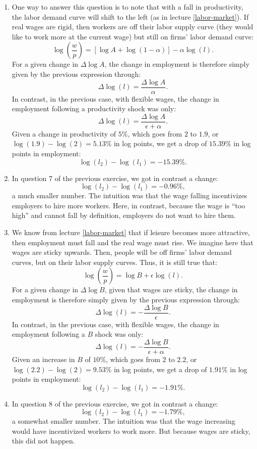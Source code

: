 \documentclass[]{book}
\theoremstyle{definition}
\theoremstyle{definition}
\theoremstyle{definition}
\theoremstyle{remark}
\begin{document}
\begin{enumerate}
\def\labelenumi{\arabic{enumi}.}
\item
  One way to answer this question is to note that with a fall in
  productivity, the labor demand curve will shift to the left (as in
  lecture \ref{labor-market}). If real wages are rigid, then workers are
  off their labor supply curve (they would like to work more at the
  current wage) but still on firms' labor demand curve:
  \[\log\left(\frac{w}{p}\right) = \left[\log A + \log(1-\alpha)\right] -\alpha \log(l).\]
  For a given change in \(\Delta \log A\), the change in employment is
  therefore simply given by the previous expression through:
  \[\Delta \log(l)=\frac{\Delta \log A}{\alpha}.\] In contrast, in the
  previous case, with flexible wages, the change in employment following
  a productivity shock was only:
  \[\Delta \log(l) = \frac{\Delta \log A}{\epsilon+\alpha}.\] Given a
  change in productivity of \(5\%\), which goes from \(2\) to \(1.9\),
  or \(\log(1.9)-\log(2)=5.13\%\) in log points, we get a drop of
  \(15.39\%\) in log points in employment:
  \[\log(l_2)-\log(l_1)=-15.39\%.\]
\item
  In question 7 of the previous exercise, we got in contrast a change:
  \[\log(l_2)-\log(l_1)=-0.96\%,\] a much smaller number. The intuition
  was that the wage falling incentivizes employers to hire more workers.
  Here, in contrast, because the wage is ``too high'' and cannot fall by
  definition, employers do not want to hire them.
\item
  We know from lecture \ref{labor-market} that if leisure becomes more
  attractive, then employment must fall and the real wage must rise. We
  imagine here that wages are sticky upwards. Then, people will be off
  firms' labor demand curves, but on their labor supply curves. Thus, it
  is still true that:
  \[\log\left(\frac{w}{p}\right)=\log B + \epsilon \log(l).\] For a
  given change in \(\Delta \log B\), given that wages are sticky, the
  change in employment is therefore simply given by the previous
  expression through:
  \[\Delta \log(l)=-\frac{\Delta \log B}{\epsilon}.\] In contrast, in
  the previous case, with flexible wages, the change in employment
  following a \(B\) shock was only:
  \[\Delta \log(l) =- \frac{\Delta \log B}{\epsilon+\alpha}.\] Given an
  increase in \(B\) of \(10\%\), which goes from \(2\) to \(2.2\), or
  \(\log(2.2)-\log(2)=9.53\%\) in log points, we get a drop of
  \(1.91\%\) in log points in employment:
  \[\log(l_2)-\log(l_1)=-1.91\%.\]
\item
  In question 8 of the previous exercise, we got in contrast a change:
  \[\log(l_2)-\log(l_1)=-1.79\%,\] a somewhat smaller number. The
  intuition was that the wage increasing would have incentivized workers
  to work more. But because wages are sticky, this did not happen.
\end{enumerate}
\end{document}
